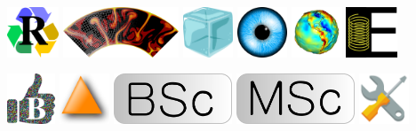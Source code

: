 \noindent
\includegraphics[height=1.5cm]{images/pictograms/replication}
\includegraphics[height=1.5cm]{images/pictograms/aspect_logo}
\includegraphics[height=1.5cm]{images/pictograms/ice}
\includegraphics[height=1.5cm]{images/pictograms/visualisation}
\includegraphics[height=1.5cm]{images/pictograms/gravity}
\includegraphics[height=1.5cm]{images/pictograms/elasticity}

\noindent
\includegraphics[height=1.5cm]{images/pictograms/benchmark}
\includegraphics[height=1.5cm]{images/pictograms/triangle}
\includegraphics[height=1.5cm]{images/pictograms/bsc}
\includegraphics[height=1.5cm]{images/pictograms/msc}
\includegraphics[height=1.5cm]{images/pictograms/tools}


